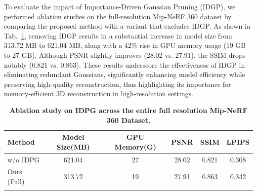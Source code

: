 To evaluate the impact of Importance-Driven Gaussian Pruning (IDGP), we performed ablation studies on the full-resolution Mip-NeRF 360 dataset by comparing the proposed method with a variant that excludes IDGP. 
As shown in Tab.~\ref{tab6}, removing IDGP results in a substantial increase in model size from 313.72 MB to 621.04 MB, along with a 42\% rise in GPU memory usage (19 GB to 27 GB). Although PSNR slightly improves (28.02 vs. 27.91), the SSIM drops notably (0.821 vs. 0.863). These results underscore the effectiveness of IDGP in eliminating redundant Gaussians, significantly enhancing model efficiency while preserving high-quality reconstruction, thus highlighting its importance for memory-efficient 3D reconstruction in high-resolution settings.


\begin{table}[h]
    \centering
    \small
    \caption{{\textbf{Ablation study on IDPG across the entire full resolution Mip-NeRF 360 Dataset\cite{Mip-NeRF360}.}} }
    \label{tab:3}
    \begin{tabular}{@{}lccccc@{}}
    \toprule
    \textbf{Method} & \textbf{Model Size(MB)} & \textbf{GPU Memory(G)} & \textbf{PSNR} & \textbf{SSIM} & \textbf{LPIPS} \\
    \midrule
    w/o IDPG &  621.04    & 27     & 28.02 & 0.821 & 0.308 \\
    Ours (Full)           & 313.72        &   19  & 27.91 & 0.863 & 0.342 \\
    \bottomrule
      \label{tab6}
    \end{tabular}
    \vspace{-0.2cm}
\end{table}




